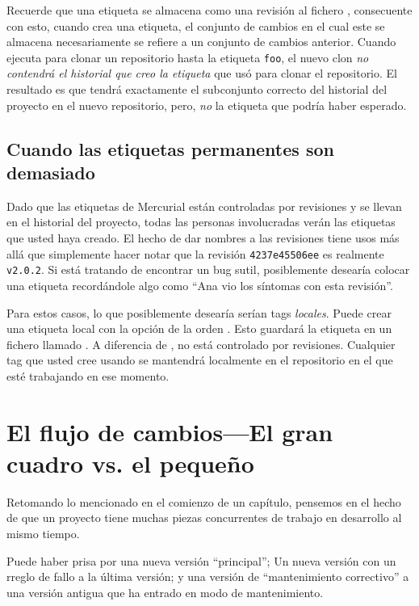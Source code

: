 Recuerde que una etiqueta se almacena como una revisión al fichero
, consecuente con esto, cuando crea una etiqueta, el
conjunto de cambios en el cual este se almacena necesariamente se
refiere a un conjunto de cambios anterior. Cuando ejecuta
 para clonar un repositorio hasta la etiqueta
\texttt{foo}, el nuevo clon \emph{no contendrá el historial que creo
la etiqueta} que usó para clonar el repositorio. El resultado es que tendrá
exactamente el subconjunto correcto del historial del proyecto en el
nuevo repositorio, pero, \emph{no} la etiqueta que podría haber esperado.

\subsection{Cuando las etiquetas permanentes son demasiado}

Dado que las etiquetas de Mercurial están controladas por revisiones y se
llevan en el historial del proyecto, todas las personas involucradas
verán las etiquetas que usted haya creado. El hecho de dar nombres a las
revisiones tiene usos más allá que simplemente hacer notar que la
revisión \texttt{4237e45506ee} es realmente \texttt{v2.0.2}.  Si está
tratando de encontrar un bug sutil, posiblemente desearía colocar una 
etiqueta recordándole algo como ``Ana vio los síntomas con esta revisión''.

Para estos casos, lo que posiblemente desearía serían tags
\emph{locales}. Puede crear una etiqueta local con la opción 
de la orden .  Esto guardará la etiqueta en un fichero llamado
.  A diferencia de ,
 no está controlado por revisiones.
Cualquier tag que usted cree usando  se mantendrá
localmente en el repositorio en el que esté trabajando en ese momento.

\section{El flujo de cambios---El gran cuadro vs. el pequeño}

Retomando lo mencionado en el comienzo de un capítulo, pensemos en el
hecho de que un proyecto tiene muchas piezas concurrentes de trabajo
en desarrollo al mismo tiempo.

Puede haber prisa por una nueva versión ``principal''; Un nueva
versión con un rreglo de fallo a la última versión; y una versión de
``mantenimiento correctivo'' a una versión antigua que ha entrado en
modo de mantenimiento.

